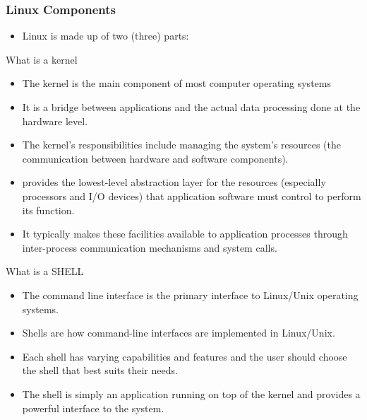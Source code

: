 \documentclass[slidestop,mathserif,compress,xcolor=svgnames]{beamer}
\newenvironment{eblock}[0]
{
\begin{beamerboxesrounded}[upper=uppercol2,lower=lowercol2,shadow=true]}
{\end{beamerboxesrounded}}
\begin{document}
\begin{frame}[allowframebreaks]
  \frametitle{\small Linux Components}
  \begin{itemize}
    \item Linux is made up of two (three) parts:
  \end{itemize}
  
  \begin{eblock}{What is a kernel}
    \begin{itemize}
      \item The kernel is the main component of most computer operating systems
      \item It is a bridge between applications and the actual data processing done at the hardware level.
      \item The kernel's responsibilities include managing the system's resources (the communication between hardware and software components).
      \item provides the lowest-level abstraction layer for the resources (especially processors and I/O devices) that application software must control to perform its function.
      \item It typically makes these facilities available to application processes through inter-process communication mechanisms and system calls.
    \end{itemize}
  \end{eblock}
  \begin{eblock}{What is a SHELL}
    \begin{itemize}
      \item The command line interface is the primary interface to Linux/Unix operating systems.
      \item Shells are how command-line interfaces are implemented in Linux/Unix.
      \item Each shell has varying capabilities and features and the user should choose the shell that best suits their needs.
      \item The shell is simply an application running on top of the kernel and provides a powerful interface to the system.
    \end{itemize}
  \end{eblock}
\end{frame}
\end{document}
